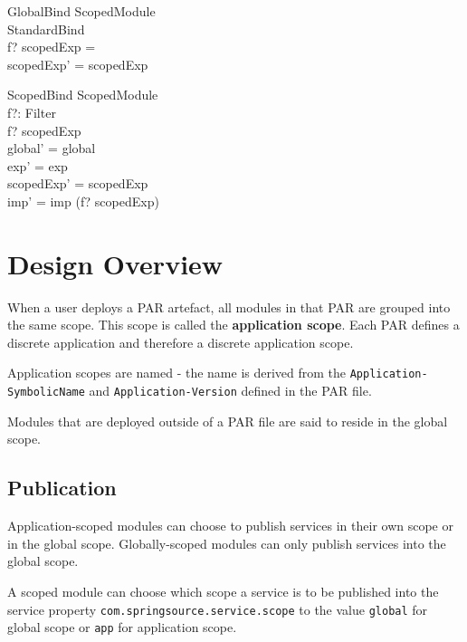 \documentclass[a4paper]{article}
\begin{document}
\begin{schema}{GlobalBind}
\Delta ScopedModule \\
StandardBind \\
\where
f? \cap scopedExp = \emptyset \\
scopedExp' = scopedExp
\end{schema}

\begin{schema}{ScopedBind}
\Delta ScopedModule \\
f?: Filter \\
\where
f? \cap scopedExp \neq \emptyset \\
global' = global \\
exp' = exp \\
scopedExp' = scopedExp \\
imp' = imp \cup (f? \cap scopedExp) \\
\end{schema}


\clearpage
\section{Design Overview}

When a user deploys a PAR artefact, all modules in that PAR are grouped into the same scope. This scope is called the \textbf{application scope}. Each PAR defines a discrete application and therefore a discrete application scope. 

Application scopes are named - the name is derived from the \texttt{Application-SymbolicName} and \texttt{Application-Version} defined in the PAR file.

Modules that are deployed outside of a PAR file are said to reside in the global scope. 

\subsection{Publication}

Application-scoped modules can choose to publish services in their own scope or in the global scope. Globally-scoped modules can only publish services into the global scope.

A scoped module can choose which scope a service is to be published into the service property \texttt{com.springsource.service.scope} to the value \texttt{global} for global scope or \texttt{app} for application scope.
\end{document}
